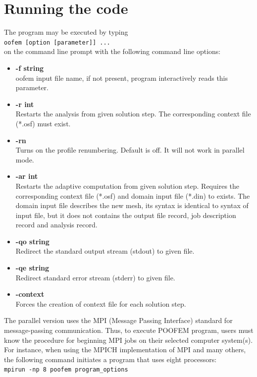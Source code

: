 \documentclass[a4paper]{article}
\newcommand{\Pmode}[1]{{\sffamily #1}}
\begin{document}
\section{Running the code}
\label{_running_the_code}
The program may be executed by typing\\
\texttt{oofem [option [parameter]] ...}\\
on the command line prompt with the following command line options:
\begin{itemize}
\item
{\bf -f string}\\ oofem input file name, if not present, program interactively
reads this parameter.
\item
{\bf -r int}\\
Restarts the analysis from given solution step. The corresponding
context file (*.osf) must exist.
\item
{\bf -rn}\\
Turns on the profile renumbering. Default is off. It will not work in parallel mode.
\item
{\bf -ar int}\\
Restarts the adaptive computation from given solution step.
Requires the corresponding context file (*.osf) and domain input file
(*.din) to exists. The domain input file describes the new mesh, its
syntax is identical to syntax of input file, but it does not contains
the output file record, job description record and analysis record.
\item
{\bf -qo string}\\
Redirect the standard output stream (stdout) to given file.
\item
{\bf -qe string}\\
Redirect standard error stream (stderr) to given file.
\item
{\bf -context}\\
Forces the creation of context file for each solution step.
\end{itemize}

\Pmode{
The parallel version uses the MPI (Message Passing Interface) standard for message-passing communication. Thus, to execute POOFEM program,
users must know the procedure for beginning MPI jobs on their selected computer system(s).
For instance, when using the MPICH implementation of MPI and many others, the following command initiates a program that uses eight processors: \\[2mm]
\texttt{mpirun -np 8 poofem program\_options}
}
\end{document}
